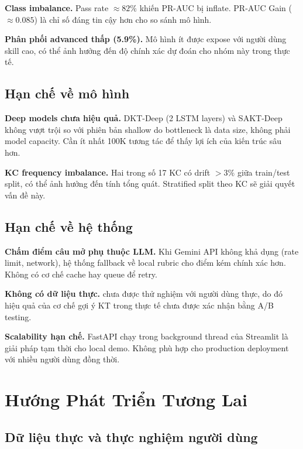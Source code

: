 \textbf{Class imbalance.} Pass rate $\approx 82\%$ khiến PR-AUC bị inflate. PR-AUC Gain ($\approx 0.085$) là chỉ số đáng tin cậy hơn cho so sánh mô hình.

\textbf{Phân phối advanced thấp (5.9\%).} Mô hình ít được expose với người dùng skill cao, có thể ảnh hưởng đến độ chính xác dự đoán cho nhóm này trong thực tế.

\subsection{Hạn chế về mô hình}

\textbf{Deep models chưa hiệu quả.} DKT-Deep (2 LSTM layers) và SAKT-Deep không vượt trội so với phiên bản shallow do bottleneck là data size, không phải model capacity. Cần ít nhất 100K tương tác để thấy lợi ích của kiến trúc sâu hơn.

\textbf{KC frequency imbalance.} Hai trong số 17 KC có drift $> 3\%$ giữa train/test split, có thể ảnh hưởng đến tính tổng quát. Stratified split theo KC sẽ giải quyết vấn đề này.

\subsection{Hạn chế về hệ thống}

\textbf{Chấm điểm câu mở phụ thuộc LLM.} Khi Gemini API không khả dụng (rate limit, network), hệ thống fallback về local rubric cho điểm kém chính xác hơn. Không có cơ chế cache hay queue để retry.

\textbf{Không có dữ liệu thực.} \system{} chưa được thử nghiệm với người dùng thực, do đó hiệu quả của cơ chế gợi ý KT trong thực tế chưa được xác nhận bằng A/B testing.

\textbf{Scalability hạn chế.} FastAPI chạy trong background thread của Streamlit là giải pháp tạm thời cho local demo. Không phù hợp cho production deployment với nhiều người dùng đồng thời.

\section{Hướng Phát Triển Tương Lai}
\label{sec:future_work}

\subsection{Dữ liệu thực và thực nghiệm người dùng}

